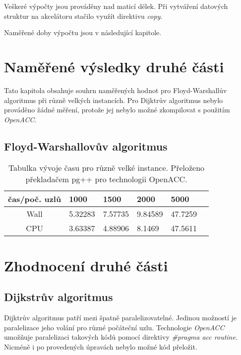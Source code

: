 \documentclass[a4paper,11pt]{article}
\begin{document}
  Veškeré výpočty jsou prováděny nad maticí délek. Při vytváření datových struktur na akcelátoru stačilo
  využít direktivu \textit{copy}.
  
  Naměřené doby výpočtu jsou v následující kapitole.
  

\section{Naměřené výsledky druhé části}\label{vysledky2}  
Tato kapitola obsahuje souhrn naměřených hodnot pro Floyd-Warshallův algoritmus při různě velkých instancích.
Pro Dijktrův algoritmus nebylo prováděno žádné měření, protože jej nebylo možné zkompilovat s použitím
\textit{OpenACC}.

\subsection{Floyd-Warshallovův algoritmus}

      \begin{table}[ht]
  \begin{center}
   \begin{tabular}{|c|l|l|l|l|l|}
    \hline 
    čas/poč. uzlů & 1000 & 1500 & 2000 & 5000\\
   \hline 
   \hline 
   Wall & 5.32283 & 7.57735 & 9.84589 & 47.7259\\
   \hline
    CPU & 3.63387 & 4.88906 & 8.1469 & 47.5611\\       
   \hline
    \end{tabular}
   \caption{Tabulka vývoje času pro různě velké instance. Přeloženo překladačem pg++ pro technologii OpenACC.} 
   \label{tab.tab40}
  \end{center}   
  \end{table}
  
 \section{Zhodnocení druhé části} 
  \subsection{Dijkstrův algoritmus}
  Dijktrův algoritmus patří mezi špatně paralelizovatelné. Jedinou možností je paralelizace jeho volání
  pro různé počáteční uzlu. Technologie \textit{OpenACC} umožňuje paralelizaci takových kódů pomocí direktivy
  \textit{\#pragma acc routine}. Nicméně i po provedených úpravách nebylo možné kód přeložit.
  
\end{document}
